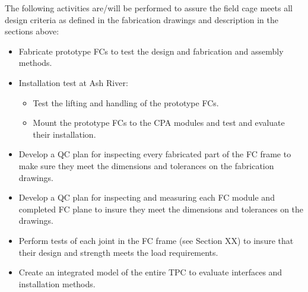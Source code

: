 The following activities are/will be performed to assure the field cage meets all design criteria as defined in the fabrication drawings and description in the sections above:
\begin{itemize}
\item	Fabricate prototype FCs to test the design and fabrication and assembly methods.
\item	Installation test at Ash River:
\begin{itemize}
\item	Test the lifting and handling of the prototype FCs.
\item	Mount the prototype FCs to the CPA modules and test and evaluate their installation.
\end{itemize}
\item	Develop a QC plan for inspecting every fabricated part of the FC frame to make sure they meet the dimensions and tolerances on the fabrication drawings.
\item	Develop a QC plan for inspecting and measuring each FC module and completed FC plane to insure they meet the dimensions and tolerances on the drawings.
\item	Perform tests of each joint in the FC frame (see Section XX) to insure that their design and strength meets the load requirements.
\item	Create an integrated model of the entire TPC to evaluate interfaces and installation methods.  
\end{itemize}

 
